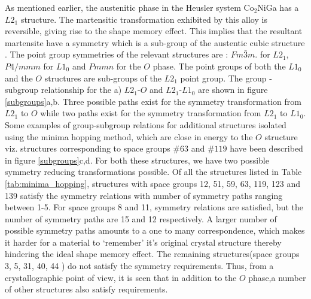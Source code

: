 \documentclass[%
preprint,
 amsmath,amssymb,
 aps,
prb,
showkeys,
]{revtex4-1}
\begin{document}
As mentioned earlier, the austenitic phase in the Heusler system Co$_2$NiGa has a $L2_1$ structure. The martensitic transformation exhibited by this alloy is reversible, giving rise to the shape memory effect. This implies that the resultant martensite have a symmetry which is a sub-group of the austentic cubic structure \cite{bhattacharya1998theory}.  The point group symmetries of the relevant structures are : $Fm\bar{3}m$.  for $L2_1$,  $P4/mmm$ for $L1_0$ and $Pmmn$ for the $O$ phase.  The point groups of both the $L1_0$ and the $O$  structures are sub-groups of the $L2_1$  point group. The group - subgroup relationship for the a) $L2_1$-$O$ and  $L2_1$-$L1_0$ are shown in figure \ref{subgroups}a,b. Three possible paths  exist for the symmetry transformation from $L2_1$ to $O$ while two paths exist for the symmetry transformation from $L2_1$ to $L1_0$. Some examples of group-subgroup relations for additional structures isolated using the minima hopping method, which are close in energy to the $O$ structure viz. structures corresponding 
to space groups $\#63$  and $\#119$ have been described in figure \ref{subgroups}c,d. For both these structures, we have two possible symmetry reducing transformations possible. Of all the structures listed in Table \ref{tab:minima_hopping}, structures with space groups 12, 51, 59, 63, 119, 123 and 139 satisfy the symmetry relations with number of symmetry paths ranging between 1-5. For space groups 8 and 11, symmetry relations are satisfied, but the number of symmetry paths are 15 and 12 respectively. A larger number of possible symmetry paths amounts to a one to many correspondence, which makes it harder for a material to `remember' it's original crystal structure thereby hindering the ideal shape memory effect. The remaining structures(space groups 3, 5, 31, 40, 44 ) do not satisfy the symmetry requirements. Thus, from a crystallographic point of view, it is seen that in addition to the $O$ phase,a number of other structures also satisfy requirements.
\end{document}

